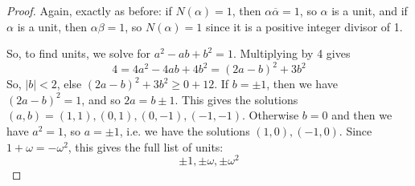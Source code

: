 \begin{proof}
    Again, exactly as before: if $N(\alpha) = 1$, then $\alpha\overline{\alpha} = 1$, so $\alpha$ is a unit, and if $\alpha$ is a unit, then $\alpha\beta = 1$, so $N(\alpha) = 1$ since it is a positive integer divisor of 1.

    So, to find units, we solve for $a^2-ab+b^2 = 1$. Multiplying by 4 gives
    \[ 4 = 4a^2-4ab+4b^2 = (2a-b)^2 + 3b^2 \]
    So, $|b| < 2$, else $(2a-b)^2 + 3b^2 \geq 0+12$. If $b = \pm 1$, then we have $(2a-b)^2 = 1$, and so $2a = b\pm 1$. This gives the solutions $(a,b) = (1,1),(0,1),(0,-1),(-1,-1)$. Otherwise $b=0$ and then we have $a^2 = 1$, so $a=\pm 1$, i.e. we have the solutions $(1,0),(-1,0)$. Since $1+\omega = -\omega^2$, this gives the full list of units:
    \[ \pm 1, \pm \omega, \pm \omega^2 \]
\end{proof}